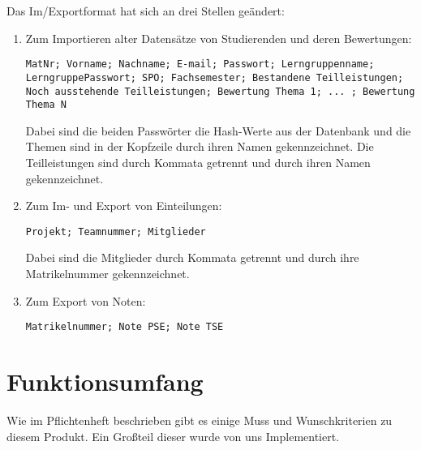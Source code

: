 \documentclass[parskip=full]{scrartcl}
\begin{document}
Das Im/Exportformat hat sich an drei Stellen geändert: 
\begin{enumerate}
  \item Zum Importieren alter Datensätze von Studierenden und deren Bewertungen:
 \\ \begin{tcolorbox}[enhanced jigsaw, %
 colback=testgrauRGB, %
 coltext=black, %
 sharp corners, %
 colframe=black, %
 boxrule=0pt %
 ]
 \texttt{MatNr; Vorname; Nachname; E-mail; Passwort; Lerngruppenname;
 LerngruppePasswort; SPO; Fachsemester; Bestandene Teilleistungen; Noch
 ausstehende Teilleistungen; Bewertung Thema 1; ... ; Bewertung Thema N}
  \end{tcolorbox}
  Dabei sind die beiden Passwörter die Hash-Werte aus der Datenbank und die
  Themen sind in der Kopfzeile durch ihren Namen gekennzeichnet. Die
  Teilleistungen sind durch Kommata getrennt und durch ihren Namen
  gekennzeichnet. 
  \item Zum Im- und Export von Einteilungen: \\ \begin{tcolorbox}[enhanced
  jigsaw,
 colback=testgrauRGB, %
 coltext=black, %
 sharp corners, %
 colframe=black, %
 boxrule=0pt %
 ]
 \texttt{Projekt; Teamnummer; Mitglieder}
  \end{tcolorbox}
  Dabei sind die Mitglieder durch Kommata getrennt und durch ihre Matrikelnummer
  gekennzeichnet.
  \item Zum Export von Noten: \\ \begin{tcolorbox}[enhanced
  jigsaw,
 colback=testgrauRGB, %
 coltext=black, %
 sharp corners, %
 colframe=black, %
 boxrule=0pt %
 ]
 \texttt{Matrikelnummer; Note PSE; Note TSE}
  \end{tcolorbox}
\end{enumerate}

\section{Funktionsumfang}
Wie im Pflichtenheft beschrieben gibt es einige Muss und Wunschkriterien zu
diesem Produkt. Ein Großteil dieser wurde von uns Implementiert.
\end{document}

